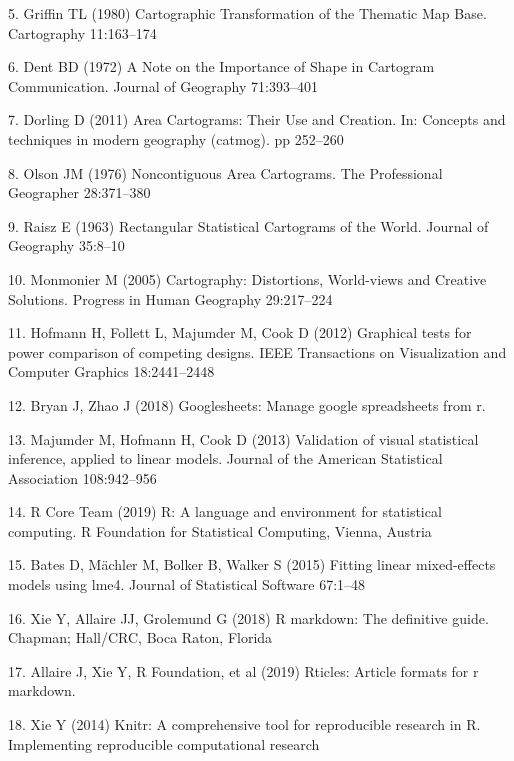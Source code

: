 \documentclass[conference,final,]{IEEEtran}
\begin{document}
\leavevmode\hypertarget{ref-CTTMB}{}%
5. Griffin TL (1980) Cartographic Transformation of the Thematic Map Base. Cartography 11:163--174

\leavevmode\hypertarget{ref-NISCC}{}%
6. Dent BD (1972) A Note on the Importance of Shape in Cartogram Communication. Journal of Geography 71:393--401

\leavevmode\hypertarget{ref-ACTUC}{}%
7. Dorling D (2011) Area Cartograms: Their Use and Creation. In: Concepts and techniques in modern geography (catmog). pp 252--260

\leavevmode\hypertarget{ref-NAC}{}%
8. Olson JM (1976) Noncontiguous Area Cartograms. The Professional Geographer 28:371--380

\leavevmode\hypertarget{ref-RSCW}{}%
9. Raisz E (1963) Rectangular Statistical Cartograms of the World. Journal of Geography 35:8--10

\leavevmode\hypertarget{ref-CDWCS}{}%
10. Monmonier M (2005) Cartography: Distortions, World-views and Creative Solutions. Progress in Human Geography 29:217--224

\leavevmode\hypertarget{ref-GTPCCD}{}%
11. Hofmann H, Follett L, Majumder M, Cook D (2012) Graphical tests for power comparison of competing designs. IEEE Transactions on Visualization and Computer Graphics 18:2441--2448

\leavevmode\hypertarget{ref-sheets}{}%
12. Bryan J, Zhao J (2018) Googlesheets: Manage google spreadsheets from r.

\leavevmode\hypertarget{ref-VVSIALM}{}%
13. Majumder M, Hofmann H, Cook D (2013) Validation of visual statistical inference, applied to linear models. Journal of the American Statistical Association 108:942--956

\leavevmode\hypertarget{ref-RCore}{}%
14. R Core Team (2019) R: A language and environment for statistical computing. R Foundation for Statistical Computing, Vienna, Austria

\leavevmode\hypertarget{ref-lme4}{}%
15. Bates D, Mächler M, Bolker B, Walker S (2015) Fitting linear mixed-effects models using lme4. Journal of Statistical Software 67:1--48

\leavevmode\hypertarget{ref-rmarkdown}{}%
16. Xie Y, Allaire JJ, Grolemund G (2018) R markdown: The definitive guide. Chapman; Hall/CRC, Boca Raton, Florida

\leavevmode\hypertarget{ref-rticles}{}%
17. Allaire J, Xie Y, R Foundation, et al (2019) Rticles: Article formats for r markdown.

\leavevmode\hypertarget{ref-knitr}{}%
18. Xie Y (2014) Knitr: A comprehensive tool for reproducible research in R. Implementing reproducible computational research
\end{document}
